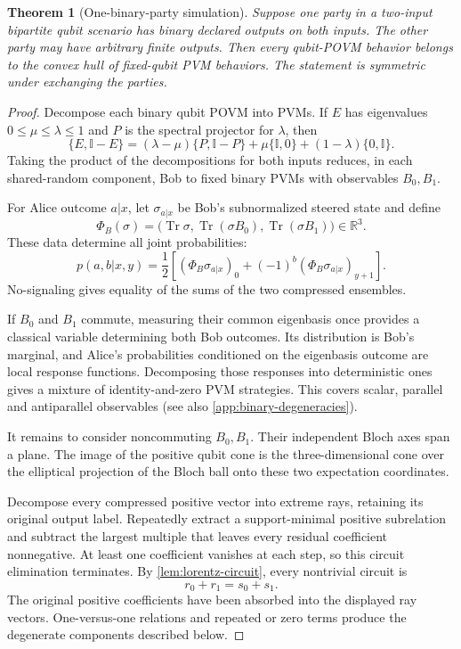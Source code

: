 \documentclass[11pt]{article}
\newtheorem{theorem}{Theorem}[section]
\theoremstyle{definition}
\newcommand{\Tr}{\operatorname{Tr}}
\newcommand{\id}{\mathbb I}
\newcommand{\R}{\mathbb R}
\begin{document}
\begin{theorem}[One-binary-party simulation]
\label{thm:binary-party}
Suppose one party in a two-input bipartite qubit scenario has binary declared
outputs on both inputs. The other party may have arbitrary finite outputs.
Then every qubit-POVM behavior belongs to the convex hull of fixed-qubit PVM
behaviors. The statement is symmetric under exchanging the parties.
\end{theorem}

\begin{proof}
Decompose each binary qubit POVM into PVMs. If \(E\) has eigenvalues
\(0\le\mu\le\lambda\le1\) and \(P\) is the spectral projector for \(\lambda\),
then
\[
\{E,\id-E\}=(\lambda-\mu)\{P,\id-P\}
+\mu\{\id,0\}+(1-\lambda)\{0,\id\}.
\]
Taking the product of the decompositions for both inputs reduces, in each
shared-random component, Bob to fixed binary PVMs with observables \(B_0,B_1\).

For Alice outcome \(a|x\), let \(\sigma_{a|x}\) be Bob's subnormalized steered
state and define
\[
\Phi_B(\sigma)=
\bigl(\Tr\sigma,\Tr(\sigma B_0),\Tr(\sigma B_1)\bigr)\in\R^3.
\]
These data determine all joint probabilities:
\[
p(a,b|x,y)=\frac12\left[
(\Phi_B\sigma_{a|x})_0+(-1)^b(\Phi_B\sigma_{a|x})_{y+1}
\right].
\]
No-signaling gives equality of the sums of the two compressed ensembles.

If \(B_0\) and \(B_1\) commute, measuring their common eigenbasis once
provides a classical variable determining both Bob outcomes. Its
distribution is Bob's marginal, and Alice's probabilities conditioned on
the eigenbasis outcome are local response functions. Decomposing those
responses into deterministic ones gives a mixture of identity-and-zero
PVM strategies. This covers scalar, parallel and antiparallel observables
(see also \cref{app:binary-degeneracies}).

It remains to consider noncommuting \(B_0,B_1\). Their independent
Bloch axes span a plane. The image of the positive qubit cone is the
three-dimensional cone over the elliptical projection of the Bloch ball
onto these two expectation coordinates.

Decompose every compressed positive vector into extreme rays, retaining its
original output label. Repeatedly extract a support-minimal positive
subrelation and subtract the largest multiple that leaves every residual
coefficient nonnegative. At least one coefficient vanishes at each step, so
this circuit elimination terminates. By \cref{lem:lorentz-circuit}, every
nontrivial circuit is
\[
r_0+r_1=s_0+s_1.
\]
The original positive coefficients have been absorbed into the displayed ray
vectors. One-versus-one relations and repeated or zero terms produce the
degenerate components described below.


\end{proof}
\end{document}
